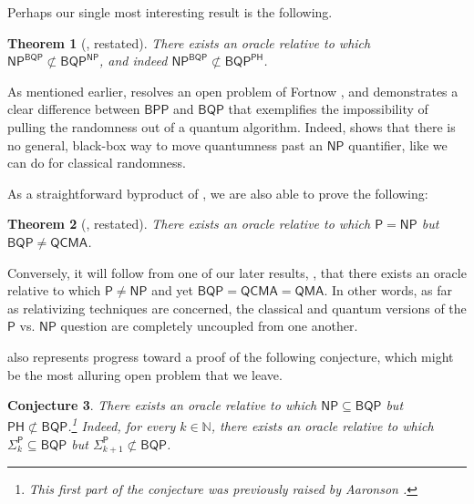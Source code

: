 \documentclass[11pt]{article}%
\newtheorem{theorem}{Theorem}
\newtheorem{conjecture}[theorem]{Conjecture}
\newcommand{\Naturals}{\mathbb{N}}
\begin{document}
Perhaps our single most interesting result is the following.

\begin{theorem}[, restated]
\label{thm:np^bqp_not_in_bqp^np_intro}
There exists an oracle relative to which $\mathsf{NP}^\mathsf{BQP} \not\subset \mathsf{BQP}^\mathsf{NP}$, and indeed $\mathsf{NP}^\mathsf{BQP} \not\subset \mathsf{BQP}^\mathsf{PH}$.
\end{theorem}

As mentioned earlier,  resolves an open problem of Fortnow \cite{For05}, and demonstrates a clear difference between $\mathsf{BPP}$ and $\mathsf{BQP}$ that exemplifies the impossibility of pulling the randomness out of a quantum algorithm. Indeed,  shows that there is no general, black-box way to move quantumness past an $\mathsf{NP}$ quantifier, like we can do for classical randomness.

As a straightforward byproduct of , we are also able to prove the following:

\begin{theorem}[, restated]
\label{thm:p=np_bqp!=qcma_intro}
There exists an oracle relative to which $\mathsf{P} = \mathsf{NP}$ but $\mathsf{BQP} \neq \mathsf{QCMA}$.
\end{theorem}

Conversely, it will follow from one of our later results, , that there exists an oracle relative to which $\mathsf{P} \neq \mathsf{NP}$ and yet $\mathsf{BQP} = \mathsf{QCMA} = \mathsf{QMA}$.  In other words, as far as relativizing techniques are concerned, the classical and quantum versions of the $\mathsf{P}$ vs. $\mathsf{NP}$ question are completely uncoupled from one another.

 also represents progress toward a proof of the following conjecture, which might be the most alluring open problem that we leave.

\begin{conjecture}
\label{conj:sigma_k_in_bqp_sigma_k+1_not}
There exists an oracle relative to which $\mathsf{NP} \subseteq \mathsf{BQP}$ but $\mathsf{PH} \not\subset \mathsf{BQP}$.\footnote{This first part of the conjecture was previously raised by Aaronson \cite{Aar10}.}  Indeed, for every $k \in \Naturals$, there exists an oracle relative to which $\mathsf{\Sigma}_k^\mathsf{P} \subseteq \mathsf{BQP}$ but $\mathsf{\Sigma}_{k+1}^\mathsf{P} \not\subset \mathsf{BQP}$.
\end{conjecture}
\end{document}
